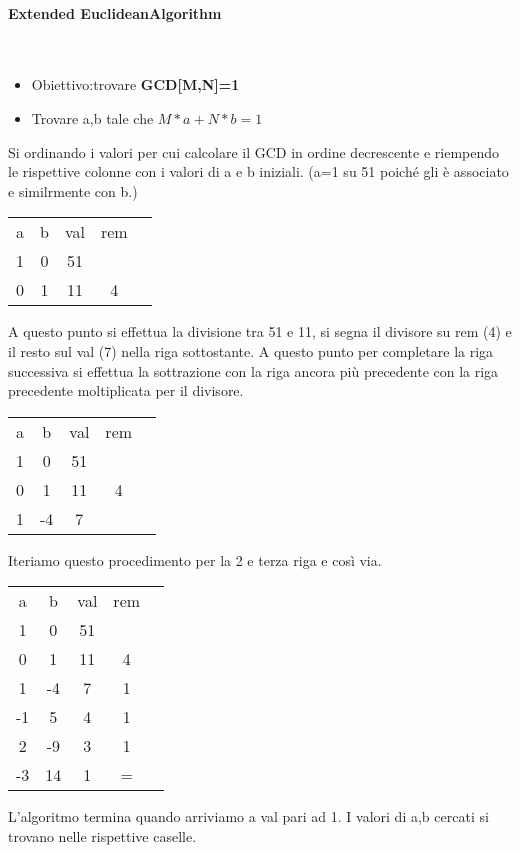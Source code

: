 \documentclass{article}
\theoremstyle{remark}
\begin{document}
\paragraph{Extended EuclideanAlgorithm}\mbox{}\\
\begin{itemize}
	\item Obiettivo:trovare \textbf{GCD[M,N]=1}
	\item Trovare a,b tale che \(M*a+N*b=1\)
\end{itemize}
Si ordinando i valori per cui calcolare il GCD in ordine decrescente e riempendo le rispettive colonne con i valori di a e b iniziali. (a=1 su 51 poiché gli è associato e similrmente con b.)
\begin{center}
	\begin{tabular}{|c|c|c|c|c|}
		a & b & val & rem \\
		1 & 0 & 51  &     \\
		0 & 1 & 11  & 4   \\
	\end{tabular}
\end{center}
A questo punto si effettua la divisione tra 51 e 11, si segna il divisore su rem (4) e il resto sul val (7) nella riga sottostante. A questo punto per completare la riga successiva si effettua la sottrazione con la riga ancora più precedente con la riga precedente moltiplicata per il divisore.
\begin{center}
	\begin{tabular}{|c|c|c|c|c|}
		a & b  & val & rem \\
		1 & 0  & 51  &     \\
		0 & 1  & 11  & 4   \\
		1 & -4 & 7   &     \\
	\end{tabular}
\end{center}
Iteriamo questo procedimento per la 2 e terza riga e così via.
\begin{center}
	\begin{tabular}{|c|c|c|c|c|}
		a  & b  & val & rem \\
		1  & 0  & 51  &     \\
		0  & 1  & 11  & 4   \\
		1  & -4 & 7   & 1   \\
		-1 & 5  & 4   & 1   \\
		2  & -9 & 3   & 1   \\
		-3 & 14 & 1   & =   \\
	\end{tabular}
\end{center}
L'algoritmo termina quando arriviamo a val pari ad 1. I valori di a,b cercati si trovano nelle rispettive caselle.
\end{document}
